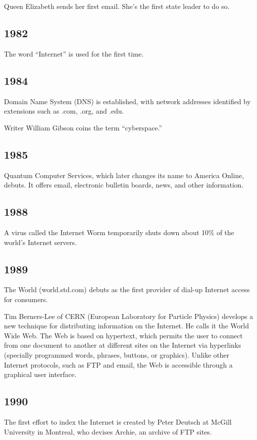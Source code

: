 \documentclass[letterpaper,12pt,english]{sphinxmanual}
\begin{document}
Queen Elizabeth sends her first email. She's the first state leader to do so.


\subsection{1982}
\label{network-timeline:id5}
The word “Internet” is used for the first time.


\subsection{1984}
\label{network-timeline:id6}
Domain Name System (DNS) is established, with network addresses identified by extensions such as .com, .org, and .edu.

Writer William Gibson coins the term “cyberspace.”


\subsection{1985}
\label{network-timeline:id7}
Quantum Computer Services, which later changes its name to America Online, debuts. It offers email, electronic bulletin boards, news, and other information.


\subsection{1988}
\label{network-timeline:id8}
A virus called the Internet Worm temporarily shuts down about 10\% of the world's Internet servers.


\subsection{1989}
\label{network-timeline:id9}
The World (world.std.com) debuts as the first provider of dial-up Internet access for consumers.

Tim Berners-Lee of CERN (European Laboratory for Particle Physics) develops a new technique for distributing information on the Internet. He calls it the World Wide Web. The Web is based on hypertext, which permits the user to connect from one document to another at different sites on the Internet via hyperlinks (specially programmed words, phrases, buttons, or graphics). Unlike other Internet protocols, such as FTP and email, the Web is accessible through a graphical user interface.


\subsection{1990}
\label{network-timeline:id10}
The first effort to index the Internet is created by Peter Deutsch at McGill University in Montreal, who devises Archie, an archive of FTP sites.
\end{document}
